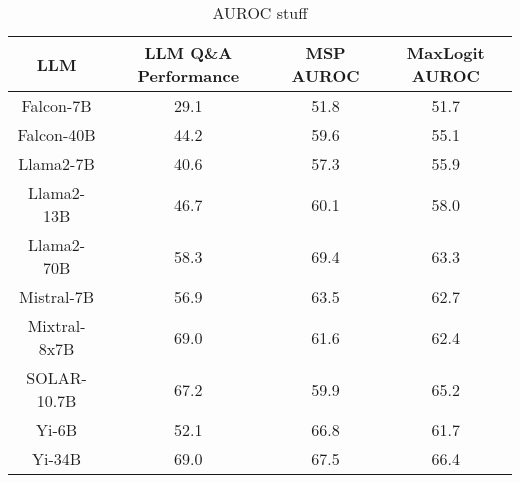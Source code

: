 \renewcommand\arraystretch{1.35}
\begin{table*}[tb]
\centering
\begin{tabular}{c|c|c|c}
LLM & LLM Q\&A Performance & MSP AUROC & MaxLogit AUROC\\ \hline
Falcon-7B & 29.1 & 51.8 & 51.7\\
Falcon-40B & 44.2 & 59.6 & 55.1\\
Llama2-7B & 40.6 & 57.3 & 55.9\\
Llama2-13B & 46.7 & 60.1 & 58.0\\
Llama2-70B & 58.3 & 69.4 & 63.3\\
Mistral-7B & 56.9 & 63.5 & 62.7\\
Mixtral-8x7B & 69.0 & 61.6 & 62.4\\
SOLAR-10.7B & 67.2 & 59.9 & 65.2\\
Yi-6B & 52.1 & 66.8 & 61.7\\
Yi-34B & 69.0 & 67.5 & 66.4\\
\hline
\end{tabular}
\caption{AUROC stuff}
\end{table*}
\label{tab:auroc}
